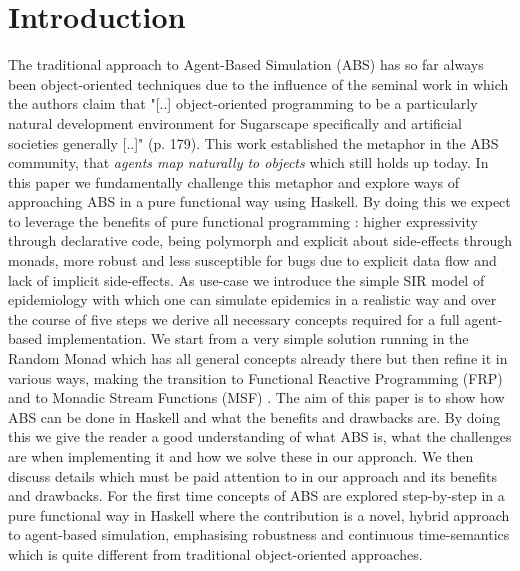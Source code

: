\section{Introduction}
The traditional approach to Agent-Based Simulation (ABS) has so far always been object-oriented techniques due to the influence of the seminal work \cite{epstein_growing_1996} in which the authors claim that "[..] object-oriented programming to be a particularly natural development environment for Sugarscape specifically and artificial societies generally [..]" (p. 179). This work established the metaphor in the ABS community, that \textit{agents map naturally to objects} \cite{north_managing_2007} which still holds up today.
In this paper we fundamentally challenge this metaphor and explore ways of approaching ABS in a pure functional way using Haskell. By doing this we expect to leverage the benefits of pure functional programming \cite{hudak_history_2007}: higher expressivity through declarative code, being polymorph and explicit about side-effects through monads, more robust and less susceptible for bugs due to explicit data flow and lack of implicit side-effects.
As use-case we introduce the simple SIR model of epidemiology with which one can simulate epidemics in a realistic way and over the course of five steps we derive all necessary concepts required for a full agent-based implementation. We start from a very simple solution running in the Random Monad which has all general concepts already there but then refine it in various ways, making the transition to Functional Reactive Programming (FRP) \cite{wan_functional_2000} and to Monadic Stream Functions (MSF) \cite{perez_functional_2016}.
The aim of this paper is to show how ABS can be done in Haskell and what the benefits and drawbacks are. By doing this we give the reader a good understanding of what ABS is, what the challenges are when implementing it and how we solve these in our approach. We then discuss details which must be paid attention to in our approach and its benefits and drawbacks. For the first time concepts of ABS are explored step-by-step in a pure functional way in Haskell where the contribution is a novel, hybrid approach to agent-based simulation, emphasising robustness and continuous time-semantics which is quite different from traditional object-oriented approaches.